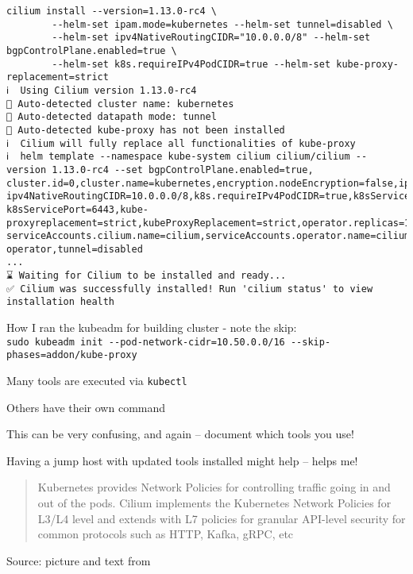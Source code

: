 \documentclass[Screen16to9,17pt]{foils}
\begin{document}
\begin{verbatim}
cilium install --version=1.13.0-rc4 \
		--helm-set ipam.mode=kubernetes --helm-set tunnel=disabled \
		--helm-set ipv4NativeRoutingCIDR="10.0.0.0/8" --helm-set bgpControlPlane.enabled=true \
		--helm-set k8s.requireIPv4PodCIDR=true --helm-set kube-proxy-replacement=strict
ℹ️  Using Cilium version 1.13.0-rc4
🔮 Auto-detected cluster name: kubernetes
🔮 Auto-detected datapath mode: tunnel
🔮 Auto-detected kube-proxy has not been installed
ℹ️  Cilium will fully replace all functionalities of kube-proxy
ℹ️  helm template --namespace kube-system cilium cilium/cilium --version 1.13.0-rc4 --set bgpControlPlane.enabled=true,
cluster.id=0,cluster.name=kubernetes,encryption.nodeEncryption=false,ipam.mode=kubernetes,
ipv4NativeRoutingCIDR=10.0.0.0/8,k8s.requireIPv4PodCIDR=true,k8sServiceHost=10.137.0.26,
k8sServicePort=6443,kube-proxyreplacement=strict,kubeProxyReplacement=strict,operator.replicas=1,
serviceAccounts.cilium.name=cilium,serviceAccounts.operator.name=cilium-operator,tunnel=disabled
...
⌛ Waiting for Cilium to be installed and ready...
✅ Cilium was successfully installed! Run 'cilium status' to view installation health
\end{verbatim}


How I ran the kubeadm for building cluster - note the skip:\\
\verb+sudo kubeadm init --pod-network-cidr=10.50.0.0/16 --skip-phases=addon/kube-proxy+


\slide{Cilium CLI tool}


\begin{list2}
\item Many tools are executed via \verb+kubectl+
\item Others have their own command
\item This can be very confusing, and again -- document which tools you use!
\item Having a jump host with updated tools installed might help -- helps me!
\end{list2}

\slide{Cilium overview}


\begin{quote}
Kubernetes provides Network Policies for controlling traffic going in and out of the pods. Cilium implements the Kubernetes Network Policies for L3/L4 level and extends with L7 policies for granular API-level security for common protocols such as HTTP, Kafka, gRPC, etc
\end{quote}
Source: picture and text from 
\end{document}
